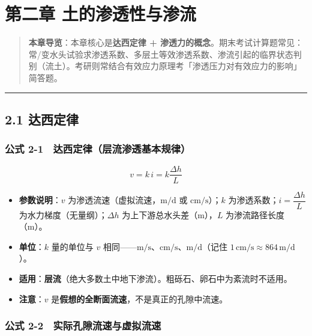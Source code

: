 \documentclass[
]{article}
\author{}
\date{}
\providecommand{\tightlist}{%
  \setlength{\itemsep}{0pt}\setlength{\parskip}{0pt}}
\begin{document}
\section{第二章
土的渗透性与渗流}\label{ux7b2cux4e8cux7ae0-ux571fux7684ux6e17ux900fux6027ux4e0eux6e17ux6d41}

\begin{quote}
\textbf{本章导览}：本章核心是\textbf{达西定律 +
渗透力的概念}。期末考试计算题常见：常/变水头试验求渗透系数、多层土等效渗透系数、渗流引起的临界状态判别（流土）。考研则常结合有效应力原理考「渗透压力对有效应力的影响」简答题。
\end{quote}

\begin{center}\rule{0.5\linewidth}{0.5pt}\end{center}

\subsection{2.1 达西定律}\label{ux8fbeux897fux5b9aux5f8b}

\subsubsection{公式
2-1　达西定律（层流渗透基本规律）}\label{ux516cux5f0f-2-1-ux8fbeux897fux5b9aux5f8bux5c42ux6d41ux6e17ux900fux57faux672cux89c4ux5f8b}

\[v=k\,i=k\frac{\Delta h}{L}\]

\begin{itemize}
\tightlist
\item
  \textbf{参数说明}：\(v\) 为渗透流速（虚拟流速，\(\mathrm{m/d}\) 或
  \(\mathrm{cm/s}\)）；\(k\) 为渗透系数；\(i=\dfrac{\Delta h}{L}\)
  为水力梯度（无量纲）；\(\Delta h\) 为上下游总水头差（m），\(L\)
  为渗流路径长度（m）。
\item
  \textbf{单位}：\(k\) 量的单位与 \(v\)
  相同------\(\mathrm{m/s}\)、\(\mathrm{cm/s}\)、\(\mathrm{m/d}\)（记住
  \(1\,\mathrm{cm/s}\approx864\,\mathrm{m/d}\)）。
\item
  \textbf{适用}：\textbf{层流}（绝大多数土中地下渗流）。粗砾石、卵石中为紊流时不适用。
\item
  \textbf{注意}：\(v\)
  是\textbf{假想的全断面流速}，不是真正的孔隙中流速。
\end{itemize}

\subsubsection{公式
2-2　实际孔隙流速与虚拟流速}\label{ux516cux5f0f-2-2-ux5b9eux9645ux5b54ux9699ux6d41ux901fux4e0eux865aux62dfux6d41ux901f}
\end{document}
